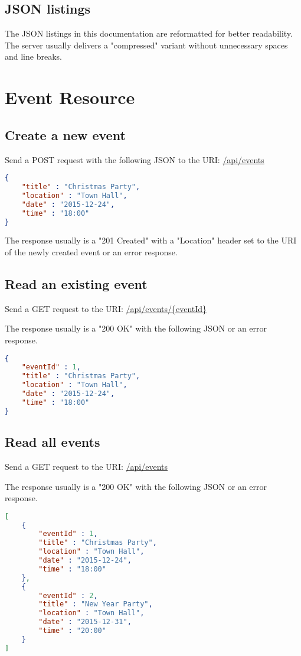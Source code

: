\documentclass[a4paper,openright,twoside]{report}
\begin{document}
\subsection{JSON listings}
The JSON listings in this documentation are reformatted for better readability. The server usually delivers a "compressed" variant without unnecessary spaces and line breaks.

\section{Event Resource}

\subsection{Create a new event}
Send a POST request with the following JSON to the URI: \url{/api/events}

\begin{lstlisting}[language=json]
{
	"title" : "Christmas Party",
	"location" : "Town Hall",
	"date" : "2015-12-24",
	"time" : "18:00"
}
\end{lstlisting}

The response usually is a "201 Created" with a "Location" header set to the URI of the newly created event or an error response.

\subsection{Read an existing event}
Send a GET request to the URI: \url{/api/events/{eventId}}

The response usually is a "200 OK" with the following JSON or an error response.

\begin{lstlisting}[language=json]
{
	"eventId" : 1,
	"title" : "Christmas Party",
	"location" : "Town Hall",
	"date" : "2015-12-24",
	"time" : "18:00"
}
\end{lstlisting}

\subsection{Read all events}
Send a GET request to the URI: \url{/api/events}

The response usually is a "200 OK" with the following JSON or an error response.

\begin{lstlisting}[language=json]
[
	{
		"eventId" : 1,
		"title" : "Christmas Party",
		"location" : "Town Hall",
		"date" : "2015-12-24",
		"time" : "18:00"
	},
	{
		"eventId" : 2,
		"title" : "New Year Party",
		"location" : "Town Hall",
		"date" : "2015-12-31",
		"time" : "20:00"
	}
]
\end{lstlisting}
\end{document}
